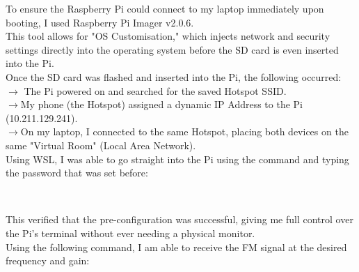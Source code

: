\documentclass[journal]{IEEEtran}
\begin{document}
To ensure the Raspberry Pi could connect to my laptop immediately upon booting, I used Raspberry Pi Imager v2.0.6.\\
This tool allows for "OS Customisation," which injects network and security settings directly into the operating system before the SD card is even inserted into the Pi.\\

Once the SD card was flashed and inserted into the Pi, the following occurred:\\

$\rightarrow$ The Pi powered on and searched for the saved Hotspot SSID.\\
$\rightarrow$My phone (the Hotspot) assigned a dynamic IP Address to the Pi (10.211.129.241).\\
$\rightarrow$On my laptop, I connected to the same Hotspot, placing both devices on the same "Virtual Room" (Local Area Network).\\

Using WSL, I was able to go straight into the Pi using the command and typing the password that was set before:
\begin{center}
\\
\end{center}
This verified that the pre-configuration was successful, giving me full control over the Pi's terminal without ever needing a physical monitor.\\

Using the following command, I am able to receive the FM signal at the desired frequency and gain:
\begin{center}
\\
\end{center}
\end{document}

